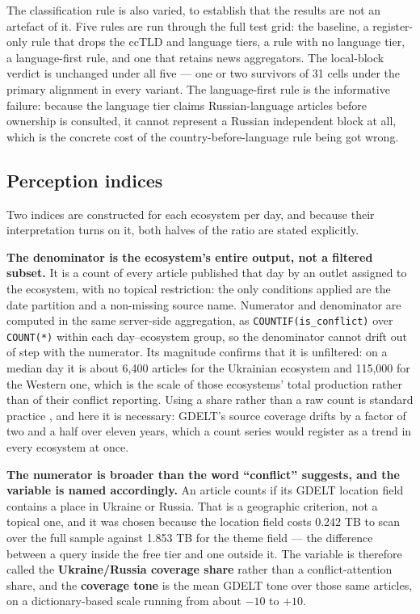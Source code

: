 \documentclass[12pt,a4paper]{article}
\begin{document}
The classification rule is also varied, to establish that the results are not an artefact of it. Five rules are run through the full test grid: the baseline, a register-only rule that drops the ccTLD and language tiers, a rule with no language tier, a language-first rule, and one that retains news aggregators. The local-block verdict is unchanged under all five --- one or two survivors of 31 cells under the primary alignment in every variant. The language-first rule is the informative failure: because the language tier claims Russian-language articles before ownership is consulted, it cannot represent a Russian independent block at all, which is the concrete cost of the country-before-language rule being got wrong.

\subsection{Perception indices}
\label{sec:indices}

Two indices are constructed for each ecosystem per day, and because their interpretation turns on it, both halves of the ratio are stated explicitly.

\textbf{The denominator is the ecosystem's entire output, not a filtered subset.} It is a count of every article published that day by an outlet assigned to the ecosystem, with no topical restriction: the only conditions applied are the date partition and a non-missing source name. Numerator and denominator are computed in the same server-side aggregation, as \texttt{COUNTIF(is\_conflict)} over \texttt{COUNT(*)} within each day--ecosystem group, so the denominator cannot drift out of step with the numerator. Its magnitude confirms that it is unfiltered: on a median day it is about 6,400 articles for the Ukrainian ecosystem and 115,000 for the Western one, which is the scale of those ecosystems' total production rather than of their conflict reporting. Using a share rather than a raw count is standard practice \citep{baker2016}, and here it is necessary: GDELT's source coverage drifts by a factor of two and a half over eleven years, which a count series would register as a trend in every ecosystem at once.

\textbf{The numerator is broader than the word ``conflict'' suggests, and the variable is named accordingly.} An article counts if its GDELT location field contains a place in Ukraine or Russia. That is a geographic criterion, not a topical one, and it was chosen because the location field costs 0.242 TB to scan over the full sample against 1.853 TB for the theme field --- the difference between a query inside the free tier and one outside it. The variable is therefore called the \textbf{Ukraine/Russia coverage share} rather than a conflict-attention share, and the \textbf{coverage tone} is the mean GDELT tone over those same articles, on a dictionary-based scale running from about $-10$ to $+10$.
\end{document}
